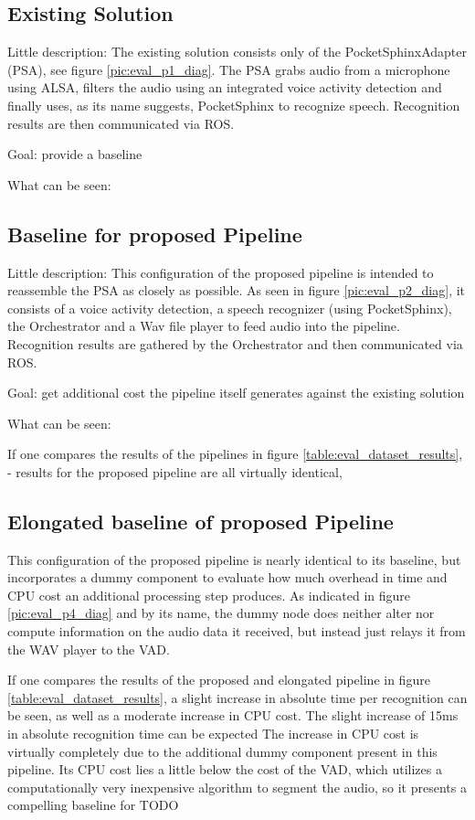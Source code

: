 \subsection{Existing Solution}

Little description:
The existing solution consists only of the PocketSphinxAdapter (PSA), see figure \ref{pic:eval_p1_diag}.
The PSA grabs audio from a microphone using ALSA, filters the audio using an integrated voice activity detection and finally uses, as its name suggests, PocketSphinx to recognize speech.
Recognition results are then communicated via ROS.

Goal: provide a baseline

What can be seen: 

\subsection{Baseline for proposed Pipeline}
Little description:
This configuration of the proposed pipeline is intended to reassemble the PSA as closely as possible.
As seen in figure \ref{pic:eval_p2_diag}, it consists of a voice activity detection, a speech recognizer (using PocketSphinx), the Orchestrator and a Wav file player to feed audio into the pipeline.
Recognition results are gathered by the Orchestrator and then communicated via ROS.

Goal: get additional cost the pipeline itself generates against the existing solution

What can be seen: 

If one compares the results of the pipelines in figure \ref{table:eval_dataset_results}, 
- results for the proposed pipeline are all virtually identical, 


\subsection{Elongated baseline of proposed Pipeline}
This configuration of the proposed pipeline is nearly identical to its baseline, but incorporates a dummy component to evaluate how much overhead in time and CPU cost an additional processing step produces.
As indicated in figure \ref{pic:eval_p4_diag} and by its name, the dummy node does neither alter nor compute information on the audio data it received, but instead just relays it from the WAV player to the VAD.

If one compares the results of the proposed and elongated pipeline in figure \ref{table:eval_dataset_results}, a slight increase in absolute time per recognition can be seen, as well as a moderate increase in CPU cost.
The slight increase of 15ms in absolute recognition time can be expected 
The increase in CPU cost is virtually completely due to the additional dummy component present in this pipeline. 
Its CPU cost lies a little below the cost of the VAD, which utilizes a computationally very inexpensive algorithm to segment the audio, so it presents a compelling baseline for TODO



